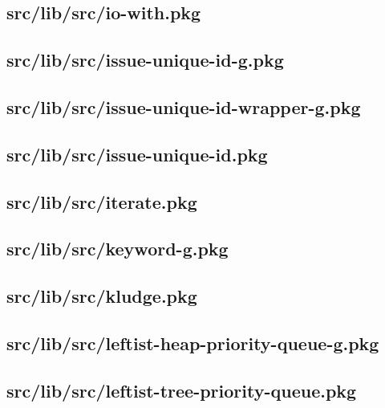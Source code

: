 \subsection{src/lib/src/io-with.pkg}


\subsection{src/lib/src/issue-unique-id-g.pkg}


\subsection{src/lib/src/issue-unique-id-wrapper-g.pkg}


\subsection{src/lib/src/issue-unique-id.pkg}


\subsection{src/lib/src/iterate.pkg}


\subsection{src/lib/src/keyword-g.pkg}


\subsection{src/lib/src/kludge.pkg}


\subsection{src/lib/src/leftist-heap-priority-queue-g.pkg}


\subsection{src/lib/src/leftist-tree-priority-queue.pkg}


